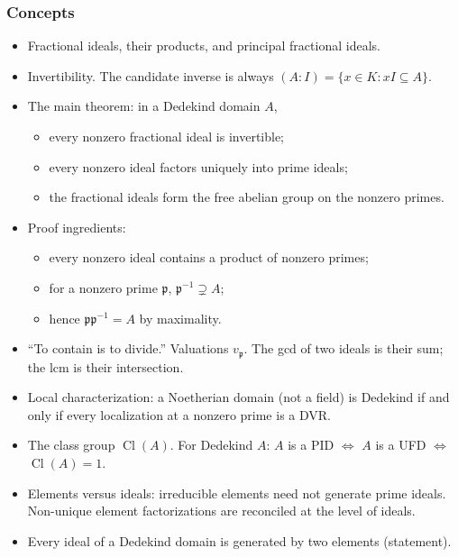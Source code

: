 \documentclass[11pt]{article}
\newcommand{\fp}{\mathfrak{p}}
\DeclareMathOperator{\Cl}{Cl}
\begin{document}
\subsubsection*{Concepts}
\begin{itemize}
  \item Fractional ideals, their products, and principal fractional ideals.
  \item Invertibility. The candidate inverse is always $(A:I)=\{x\in K: xI\subseteq A\}$.
  \item The main theorem: in a Dedekind domain $A$,
  \begin{itemize}
    \item every nonzero fractional ideal is invertible;
    \item every nonzero ideal factors uniquely into prime ideals;
    \item the fractional ideals form the free abelian group on the nonzero primes.
  \end{itemize}
  \item Proof ingredients:
  \begin{itemize}
    \item every nonzero ideal contains a product of nonzero primes;
    \item for a nonzero prime $\fp$, $\fp^{-1}\supsetneq A$;
    \item hence $\fp\fp^{-1}=A$ by maximality.
  \end{itemize}
  \item ``To contain is to divide.'' Valuations $v_\fp$. The gcd of two ideals is their sum; the lcm is their intersection.
  \item Local characterization: a Noetherian domain (not a field) is Dedekind if and only if every localization at a nonzero prime is a DVR.
  \item The class group $\Cl(A)$. For Dedekind $A$: $A$ is a PID $\iff$ $A$ is a UFD $\iff$ $\Cl(A)=1$.
  \item Elements versus ideals: irreducible elements need not generate prime ideals. Non-unique element factorizations are reconciled at the level of ideals.
  \item Every ideal of a Dedekind domain is generated by two elements (statement).
\end{itemize}
\end{document}
